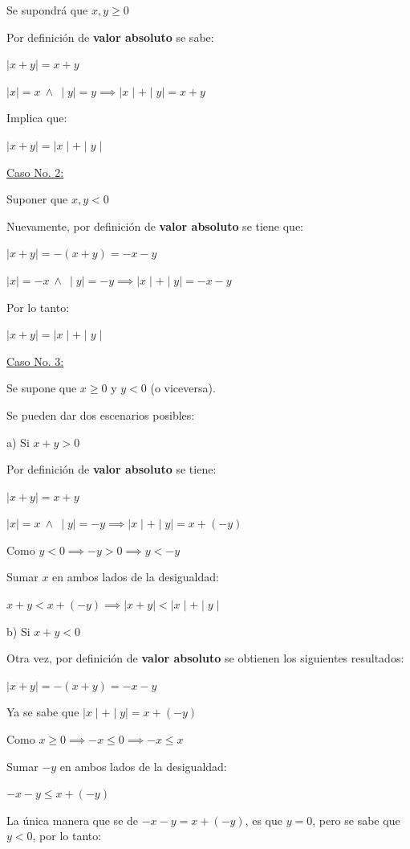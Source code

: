 \documentclass{article}
\begin{document}
Se supondrá que $x, y \ge 0$

Por definición de \textbf{valor absoluto} se sabe:

$\mid x + y \mid = x + y$

$\mid x \mid = x \ \land \  \mid y \mid = y \implies \mid x \mid + \mid y \mid = x + y$

Implica que: 

$\mid x + y \mid = \mid x \mid + \mid y \mid$

\underline{Caso No. 2:}

Suponer que $x, y < 0$

Nuevamente, por definición de \textbf{valor absoluto} se tiene que:

$\mid x + y \mid = - (x + y) = - x - y$

$\mid x \mid = - x \ \land \ \mid y \mid = - y \implies \mid x \mid + \mid y \mid = - x - y$

Por lo tanto: 

$\mid x + y \mid = \mid x \mid + \mid y \mid$

\underline{Caso No. 3:}

Se supone que $x \ge 0$ y $y < 0$ (o viceversa).

Se pueden dar dos escenarios posibles:

a) Si $x + y > 0$

Por definición de \textbf{valor absoluto} se tiene:

$\mid x + y \mid = x + y$

$\mid x \mid = x \ \land \ \mid y \mid = - y \implies \mid x \mid + \mid y \mid = x + (- y)$

Como $y < 0 \implies -y > 0 \implies y < - y$

Sumar $x$ en ambos lados de la desigualdad:

$x + y < x + (- y) \implies \mid x + y \mid < \mid x \mid + \mid y \mid$

b) Si $x + y < 0$

Otra vez, por definición de \textbf{valor absoluto} se obtienen los siguientes resultados:

$\mid x + y \mid = -(x + y) = - x - y$

Ya se sabe que $\mid x \mid + \mid y \mid = x + (- y)$

Como $x \ge 0 \implies -x \le 0 \implies -x \le x$

Sumar $- y$ en ambos lados de la desigualdad:

$- x - y \le x + (-y)$

La única manera que se de $- x - y = x + (- y)$, es que $y = 0$, pero se sabe que $y < 0$, por lo tanto:
\end{document}
